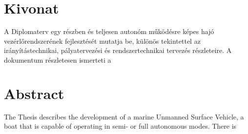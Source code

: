 \section{Kivonat}

A Diplomaterv egy részben és teljesen autonóm működésre képes hajó vezérlőrendszerének fejlesztését mutatja be, különös tekintettel az irányítástechnikai, pályatervezési és rendszertechnikai tervezés részleteire. A dokumentum részletesen ismerteti a 
\vfill

\section{Abstract}

The Thesis describes the development of a marine Unmanned Surface Vehicle, a boat that is capable of operating in semi- or full autonomous modes. There is 
\vfill

